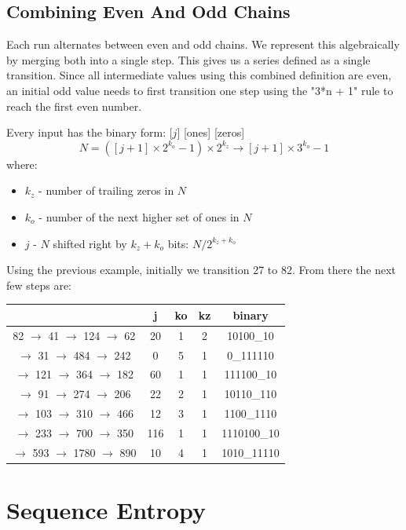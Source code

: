 \documentclass[letterpaper]{article}
\begin{document}
\subsection{Combining Even And Odd Chains}

Each run alternates between even and odd chains. We represent this algebraically by merging both into a single step. This gives us a series defined as a single transition. Since all intermediate values using this combined definition are even, an initial odd value needs to first transition one step using the "3*n + 1" rule to reach the first even number.

Every input has the binary form: [$j$] [ones] [zeros]
\[
N = ([j + 1] \times 2^{k_o} - 1) \times 2^{k_z} \rightarrow [j + 1] \times 3^{k_o} - 1
\]
where:
\begin{itemize}
    \item $k_z$ - number of trailing zeros in $N$
    \item $k_o$ - number of the next higher set of ones in $N$
    \item $j$ - $N$ shifted right by $k_z + k_o$ bits: $N / 2^{k_z + k_o}$
\end{itemize}

Using the previous example, initially we transition 27 to 82. From there the next few steps are:

\begin{center}
\begin{tabular}{|c|c|c|c|c|}
\hline
& \textbf{j} & \textbf{ko} & \textbf{kz}& \textbf{binary} \\ 
\hline
82 $\to$ 41  $\to$  124 $\to$ 62&20&1&2&10100\_10 \\ 
\hline
$\to$ 31  $\to$  484 $\to$ 242&0&5&1&0\_111110 \\ 
\hline
$\to$ 121 $\to$  364 $\to$ 182&60&1&1&111100\_10 \\ 
\hline
$\to$  91 $\to$  274 $\to$ 206&22&2&1&10110\_110 \\ 
\hline
$\to$ 103 $\to$  310 $\to$ 466&12&3&1&1100\_1110 \\ 
\hline
$\to$ 233 $\to$  700 $\to$ 350&116&1&1&1110100\_10 \\ 
\hline
$\to$ 593 $\to$ 1780 $\to$ 890&10&4&1&1010\_11110 \\ 
\hline
\end{tabular}
\end{center}

\section{Sequence Entropy}
\end{document}
